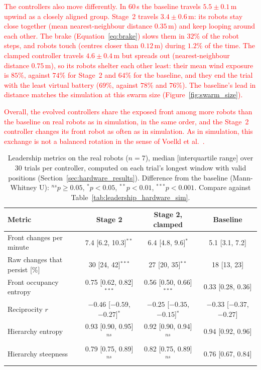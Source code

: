 \documentclass[runningheads]{llncs}
\newcommand{\rev}[1]{\textcolor{red}{#1}}
\begin{document}
\rev{The controllers also move differently.} \rev{In 60\,s the baseline travels $5.5 \pm 0.1$\,m upwind as a closely aligned group.} \rev{Stage~2 travels $3.4 \pm 0.6$\,m: its robots stay close together (mean nearest-neighbour distance $0.35$\,m) and keep looping around each other.} \rev{The brake (Equation~\ref{eq:brake}) slows them in $32\%$ of the robot steps, and robots touch (centres closer than $0.12$\,m) during $1.2\%$ of the time.} \rev{The clamped controller travels $4.6 \pm 0.4$\,m but spreads out (nearest-neighbour distance $0.75$\,m), so its robots shelter each other least: their mean wind exposure is $85\%$, against $74\%$ for Stage~2 and $64\%$ for the baseline, and they end the trial with the least virtual battery ($69\%$, against $78\%$ and $76\%$).} \rev{The baseline's lead in distance matches the simulation at this swarm size (Figure~\ref{fig:swarm_size}).}

\rev{Overall, the evolved controllers share the exposed front among more robots than the baseline on real robots as in simulation, in the same order, and the Stage~2 controller changes its front robot as often as in simulation.} \rev{As in simulation, this exchange is not a balanced rotation in the sense of Voelkl et al.~\cite{voelkl2015}.}

\begin{table}[t]
\centering\color{red}
\caption{Leadership metrics on the real robots ($n=7$), median [interquartile range] over 30 trials per controller, computed on each trial's longest window with valid positions (Section~\ref{sec:hardware_results}). Difference from the baseline (Mann-Whitney U): $^{ns}p\geq0.05$, $^{*}p<0.05$, $^{**}p<0.01$, $^{***}p<0.001$. Compare against Table~\ref{tab:leadership_hardware_sim}.}
\label{tab:leadership_hardware_hw}
\small
\begin{tabular}{lccc}
\toprule
\textbf{Metric} & \textbf{Stage 2} & \textbf{Stage 2, clamped} & \textbf{Baseline} \\
\midrule
Front changes per minute & 7.4 [6.2, 10.3]$^{**}$ & 6.4 [4.8, 9.6]$^{*}$ & 5.1 [3.1, 7.2] \\
Raw changes that persist [\%] & 30 [24, 42]$^{***}$ & 27 [20, 35]$^{**}$ & 18 [13, 23] \\
Front occupancy entropy & 0.75 [0.62, 0.82]$^{***}$ & 0.56 [0.50, 0.66]$^{***}$ & 0.33 [0.28, 0.36] \\
Reciprocity $r$ & $-0.46$ [$-0.59$, $-0.27$]$^{*}$ & $-0.25$ [$-0.35$, $-0.15$]$^{*}$ & $-0.33$ [$-0.37$, $-0.27$] \\
Hierarchy entropy & 0.93 [0.90, 0.95]$^{ns}$ & 0.92 [0.90, 0.94]$^{ns}$ & 0.94 [0.92, 0.96] \\
Hierarchy steepness & 0.79 [0.75, 0.89]$^{ns}$ & 0.82 [0.75, 0.89]$^{ns}$ & 0.76 [0.67, 0.84] \\
\bottomrule
\end{tabular}
\end{table}
\end{document}

